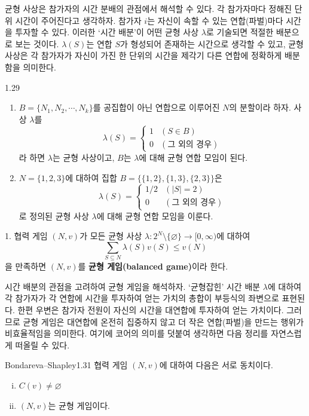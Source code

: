 \documentclass{article}
\numberwithin{equation}{section}
\begin{document}
균형 사상은 참가자의 시간 분배의 관점에서 해석할 수 있다. 각 참가자마다 정해진 단위 시간이 주어진다고 생각하자. 참가자 $i$는 자신이 속할 수 있는 연합(파벌)마다 시간을 투자할 수 있다. 이러한 `시간 배분'이 어떤 균형 사상 $\lambda$로 기술되면 적절한 배분으로 보는 것이다. $\lambda(S)$는 연합 $S$가 형성되어 존재하는 시간으로 생각할 수 있고, 균형 사상은 각 참가자가 자신이 가진 한 단위의 시간을 제각기 다른 연합에 정확하게 배분함을 의미한다.

\begin{example}{}{1.29}
	\begin{enumerate}[(1)]
		\item $B=\{N_1,N_2,\cdots,N_k\}$를 공집합이 아닌 연합으로 이루어진 $N$의 분할이라 하자. 사상 $\lambda$를
			\[
				\lambda(S)=\begin{cases}
					1 & (S\in B)\\
					0 & (\text{그 외의 경우})
				\end{cases}
			\]
			라 하면 $\lambda$는 균형 사상이고, $B$는 $\lambda$에 대해 균형 연합 모임이 된다.
		\item $N=\{1,2,3\}$에 대하여 집합 $B=\{\{1,2\},\{1,3\},\{2,3\}\}$은
			\[
				\lambda(S)=\begin{cases}
					1/2 & (\vert S\vert=2)\\
					0 & (\text{그 외의 경우})
				\end{cases}
			\]
			로 정의된 균형 사상 $\lambda$에 대해 균형 연합 모임을 이룬다.
	\end{enumerate}
\end{example}

\begin{dfn}{}{1.}
	협력 게임 $(N,v)$가 모든 균형 사상 $\lambda:2^N\setminus\{\varnothing\}\to[0,\infty)$에 대하여
	\[
		\sum_{S\subseteq N}\lambda(S)v(S)\leq v(N)
	\]
	을 만족하면 $(N,v)$를 \textbf{균형 게임(balanced game)}이라 한다.
\end{dfn}

시간 배분의 관점을 고려하여 균형 게임을 해석하자. `균형잡힌' 시간 배분 $\lambda$에 대하여 각 참가자가 각 연합에 시간을 투자하여 얻는 가치의 총합이 부등식의 좌변으로 표현된다. 한편 우변은 참가자 전원이 자신의 시간을 대연합에 투자하여 얻는 가치이다. 그러므로 균형 게임은 대연합에 온전히 집중하지 않고 더 작은 연합(파벌)을 만드는 행위가 비효율적임을 의미한다. 여기에 코어의 의미를 덧붙여 생각하면 다음 정리를 자연스럽게 떠올릴 수 있다.

\begin{thm}{Bondareva--Shapley}{1.31}
	협력 게임 $(N,v)$에 대하여 다음은 서로 동치이다.
	\begin{enumerate}[(i)]
		\item $C(v)\ne\varnothing$
		\item $(N,v)$는 균형 게임이다.
	\end{enumerate}
\end{thm}
\end{document}
